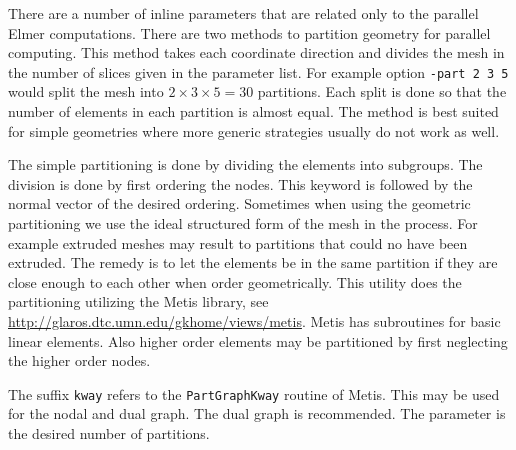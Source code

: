 There are a number of inline parameters that are related only to the parallel Elmer computations.
%
\sifbegin
{} 
There are two methods to partition geometry for parallel computing. This
method takes each coordinate direction and divides the mesh in the number
of slices given in the parameter list. For example option
\texttt{-part 2 3 5} would split the mesh into $2\times 3 \times 5 = 30$ partitions. 
Each split is done so that the number of elements in each partition
is almost equal. The method is best suited for simple geometries 
where more generic strategies usually do not work as well.



%
The simple partitioning is done by dividing the elements
into subgroups. The division is done by first ordering the nodes. This
keyword is followed by the normal vector of the desired ordering.
%
Sometimes when using the geometric partitioning we use the ideal
structured form of the mesh in the process. For example extruded meshes
may result to partitions that could no have been extruded. The remedy
is to let the elements be in the same partition if they are close enough
to each other when order geometrically.
%
This utility does the partitioning utilizing the Metis library, see
\url{http://glaros.dtc.umn.edu/gkhome/views/metis}. Metis has subroutines
for basic linear elements. Also higher order elements may be partitioned
by first neglecting the higher order nodes.

The suffix \texttt{kway} refers to the \texttt{PartGraphKway} routine of Metis. 
This may be used for the nodal and dual graph. The dual graph is recommended. 
The parameter is the desired number of partitions. 


